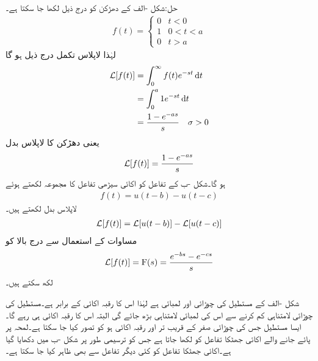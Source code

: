 حل:شکل -الف کے دھڑکن کو درج ذیل لکھا جا سکتا ہے۔
\begin{align}
f(t)=
\begin{cases}
0& t<0\\
1& 0<t<a\\
0& t>a
\end{cases}
\end{align}
لہٰذا لاپلاس تکمل درج ذیل ہو گا
\begin{align*}
\Laplace[f(t)]&=\int_0^{\infty} f(t) e^{-st} \dif t\\
&=\int_0^a 1e^{-st} \dif t\\
&=\frac{1-e^{-as}}{s} \quad \sigma >0
\end{align*}
یعنی دھڑکن کا لاپلاس بدل
\begin{align}
\mathcal{L}[f(t)]=\frac{1-e^{-as}}{s}
\end{align}
ہو گا۔شکل -ب کے تفاعل کو اکائی سیڑھی تفاعل کا مجموعہ لکھتے ہوئے
\begin{align*}
f(t)=u(t-b)-u(t-c)
\end{align*} 
لاپلاس بدل لکھتے ہیں۔
\begin{align*}
\mathcal{L}[f(t)]=\mathcal{L}[u(t-b)]-\mathcal{L}[u(t-c)]
\end{align*}
مساوات  کے استعمال سے درج بالا کو 
\begin{align}
\mathcal{L}[f(t)]={{\textup{F}}}(s)=\frac{e^{-bs}-e^{-cs}}{s}
\end{align}
لکھ سکتے ہیں۔

شکل -الف کے مستطیل کی چوڑائی  اور لمبائی  ہے لہٰذا اس کا رقبہ 
 اکائی کے برابر ہے۔مستطیل کی چوڑائی لامتناہی کم  کرنے سے اس کی لمبائی لامتناہی بڑھ  جائے گی البتہ اس کا رقبہ اکائی ہی رہے گا۔ایسا مستطیل جس کی چوڑائی صفر کے قریب تر اور رقبہ اکائی ہو کو  تصور کیا جا سکتا ہے۔لمحہ  پر پائے جانے والے اکائی جھٹکا تفاعل کو  لکھا جاتا ہے جس کو ترسیمی طور پر شکل -ب میں دکھایا گیا ہے۔اکائی جھٹکا تفاعل کو کئی دیگر تفاعل سے بھی ظاہر کیا جا سکتا ہے۔

